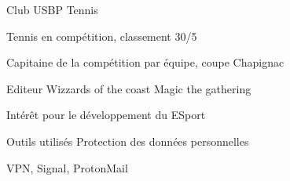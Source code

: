 

\begin{cventries}

  \cventry
    {Club USBP} %
    {Tennis} %
    {} %
    {} %
    {
      \begin{cvitems} %
        \item {Tennis en compétition, classement 30/5}
        \item {Capitaine de la compétition par équipe, coupe Chapignac}
      \end{cvitems}
    }

  \cventry
    {Editeur Wizzards of the coast} %
    {Magic the gathering} %
    {} %
    {} %
    {
      \begin{cvitems} %
        \item {Intérêt pour le développement du ESport}
      \end{cvitems}
    }

  \cventry
    {Outils utilisés} %
    {Protection des données personnelles} %
    {} %
    {} %
    {
      \begin{cvitems} %
        \item {VPN, Signal, ProtonMail}
      \end{cvitems}
    }

\end{cventries}
